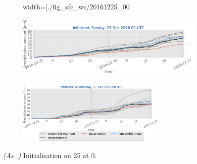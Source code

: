 \begin{figure}[H]
\begin{subfigure}[b]{0.93\textwidth}
		width=\textwidth]{./fig_sfc_ws/20161225_00}
		\caption{}\label{fig:res:sfc_ws25}
	\end{subfigure}
	\begin{subfigure}[b]{0.93\textwidth}
		\includegraphics[trim={0.cm 1.5cm 0cm 0cm},clip,
		width=\textwidth]{./fig_sfc_precip/20161225_00}
		\caption{}\label{fig:res:sfc_precip25}
	\end{subfigure}
	\begin{subfigure}[b]{\textwidth}
		\centering
		\includegraphics[trim={5.5cm 0cm 5.cm 17.7cm},clip,
		width=0.8\textwidth]{./fig_sfc_precip/20161221_00_label}
	\end{subfigure}
	\caption{\textit{(As .)} Initialisation on \SI{25}{\dec} at \SI{0}{\UTC}.}\label{fig:obs_meps:25}
\end{figure}
%
